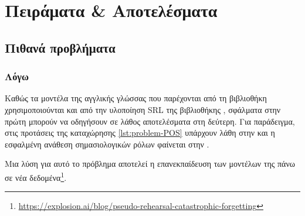 \chapter{Πειράματα \& Αποτελέσματα}\label{chap:results}%
\section{Πιθανά προβλήματα}\label{sec:problems}
\subsection{Λόγω }\label{subsec:problems-spacy}
Καθώς τα μοντέλα της αγγλικής γλώσσας που παρέχονται από τη βιβλιοθήκη  χρησιμοποιούνται και από την υλοποίηση SRL της βιβλιοθήκης ,
σφάλματα στην πρώτη μπορούν να οδηγήσουν σε λάθος αποτελέσματα στη δεύτερη.
Για παράδειγμα, στις προτάσεις της καταχώρησης \ref{lst:problem-POS} υπάρχουν λάθη στην 
και η εσφαλμένη ανάθεση σημασιολογικών ρόλων φαίνεται στην .

Μια λύση για αυτό το πρόβλημα αποτελεί η επανεκπαίδευση των μοντέλων της  πάνω σε νέα δεδομένα\footnote{\url{https://explosion.ai/blog/pseudo-rehearsal-catastrophic-forgetting}}.


